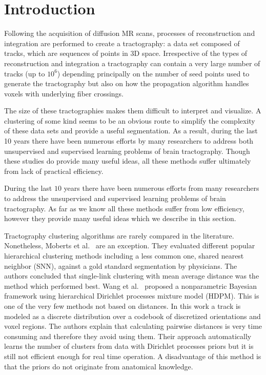 \documentclass{bioinfo}
\begin{document}
\section{Introduction}

Following the acquisition of diffusion MR scans, processes of
reconstruction and integration are performed to
create a tractography: a data set composed of tracks, which are
sequences of points in 3D space. Irrespective of the types of
reconstruction and integration a tractography can contain a very large
number of tracks (up to $10^6$) depending principally on the number of
seed points used to generate the tractography but also on how the
propagation algorithm handles voxels with underlying fiber crossings.

The size of these tractographies makes them difficult to interpret and
visualize. A clustering of some kind seems to be an obvious route to
simplify the complexity of these data sets and provide a useful
segmentation.  As a result, during the last 10 years there have been
numerous efforts by many researchers to address both unsupervised and
supervised learning problems of brain tractography. Though these studies
do provide many useful ideas, all these methods suffer ultimately from
lack of practical efficiency.

During the last $10$ years there have been numerous efforts from
many researchers to address the unsupervised and supervised learning
problems of brain tractography. As far as we know all these methods
suffer from low efficiency, however they provide many useful ideas
which we describe in this section. 

Tractography clustering algorithms are rarely compared in the literature.
Nonetheless, Moberts et al.~\cite{moberts2005evaluation} are an
exception. They evaluated different popular hierarchical clustering
methods including a less common one, shared nearest neighbor (SNN),
against a gold standard segmentation by physicians. The authors concluded
that single-link clustering with mean average distance was the method
which performed best. Wang et al.~\cite{wang2010tractography} proposed
a nonparametric Bayesian framework using hierarchical Dirichlet processes
mixture model (HDPM). This is one of the very few methods not based
on distances. In this work a track is modeled as a discrete distribution
over a codebook of discretized orientations and voxel regions. The
authors explain that calculating pairwise distances is very time consuming
and therefore they avoid using them. Their approach automatically
learns the number of clusters from data with Dirichlet processes priors
but it is still not efficient enough for real time operation. A disadvantage
of this method is that the priors do not originate from anatomical
knowledge. 
\end{document}
